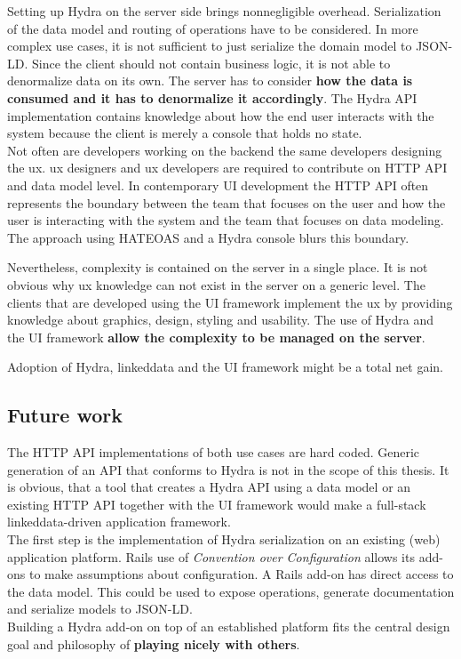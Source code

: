 Setting up Hydra on the server side brings nonnegligible overhead. Serialization of the data model and routing of operations have to be considered. In more complex use cases, it is not sufficient to just serialize the domain model to JSON-LD. Since the client should not contain business logic, it is not able to denormalize data on its own. The server has to consider \textbf{how the data is consumed and it has to denormalize it accordingly}. The Hydra API implementation contains knowledge about how the end user interacts with the system because the client is merely a \gls{console} that holds no state. \\
Not often are developers working on the \gls{backend} the same developers designing the \gls{ux}. \gls{ux} designers and \gls{ux} developers are required to contribute on HTTP API and data model level. In contemporary UI development the HTTP API often represents the boundary between the team that focuses on the user and how the user is interacting with the system and the team that focuses on data modeling. The approach using HATEOAS and a Hydra \gls{console} blurs this boundary.

Nevertheless, complexity is contained on the server in a single place. It is not obvious why \gls{ux} knowledge can not exist in the server on a generic level. The clients that are developed using the UI framework implement the \gls{ux} by providing knowledge about graphics, design, styling and usability. The use of Hydra and the UI framework \textbf{allow the complexity to be managed on the server}.

Adoption of Hydra, \gls{linkeddata} and the UI framework might be a total net gain.

\subsection{Future work}
The HTTP API implementations of both use cases are hard coded. Generic generation of an API that conforms to Hydra is not in the scope of this thesis. It is obvious, that a tool that creates a Hydra API using a data model or an existing HTTP API together with the UI framework would make a full-stack \gls{linkeddata}-driven application framework. \\
The first step is the implementation of Hydra serialization on an existing (web) application platform. Rails use of \textit{Convention over Configuration} allows its add-ons to make assumptions about configuration. A Rails add-on has direct access to the data model. This could be used to expose operations, generate documentation and serialize models to JSON-LD. \\
Building a Hydra add-on on top of an established platform fits the central design goal and philosophy of \textbf{playing nicely with others}.

